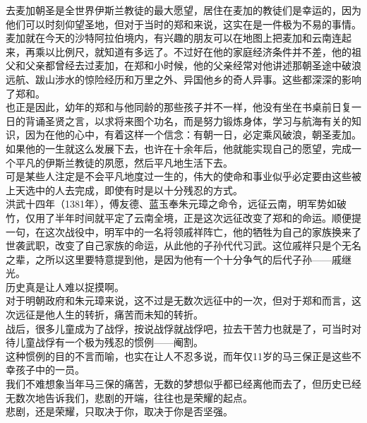 \begin{multicols}{\theparacolNo}
去麦加朝圣是全世界伊斯兰教徒的最大愿望，居住在麦加的教徒们是幸运的，因为他们可以时刻仰望圣地，但对于当时的郑和来说，这实在是一件极为不易的事情。麦加就在今天的沙特阿拉伯境内，有兴趣的朋友可以在地图上把麦加和云南连起来，再乘以比例尺，就知道有多远了。不过好在他的家庭经济条件并不差，他的祖父和父亲都曾经去过麦加，在郑和小时候，他的父亲经常对他讲述那朝圣途中破浪远航、跋山涉水的惊险经历和万里之外、异国他乡的奇人异事。这些都深深的影响了郑和。\\

也正是因此，幼年的郑和与他同龄的那些孩子并不一样，他没有坐在书桌前日复一日的背诵圣贤之言，以求将来图个功名，而是努力锻炼身体，学习与航海有关的知识，因为在他的心中，有着这样一个信念：有朝一日，必定乘风破浪，朝圣麦加。\\

如果他的一生就这么发展下去，也许在十余年后，他就能实现自己的愿望，完成一个平凡的伊斯兰教徒的夙愿，然后平凡地生活下去。\\

可是某些人注定是不会平凡地度过一生的，伟大的使命和事业似乎必定要由这些被上天选中的人去完成，即使有时是以十分残忍的方式。\\

洪武十四年（1381年），傅友德、蓝玉奉朱元璋之命令，远征云南，明军势如破竹，仅用了半年时间就平定了云南全境，正是这次远征改变了郑和的命运。顺便提一句，在这次战役中，明军中的一名将领戚祥阵亡，他的牺牲为自己的家族换来了世袭武职，改变了自己家族的命运，从此他的子孙代代习武。这位戚祥只是个无名之辈，之所以这里要特意提到他，是因为他有一个十分争气的后代子孙——戚继光。\\

历史真是让人难以捉摸啊。\\

对于明朝政府和朱元璋来说，这不过是无数次远征中的一次，但对于郑和而言，这次远征是他人生的转折，痛苦而未知的转折。\\

战后，很多儿童成为了战俘，按说战俘就战俘吧，拉去干苦力也就是了，可当时对待儿童战俘有一个极为残忍的惯例——阉割。\\

这种惯例的目的不言而喻，也实在让人不忍多说，而年仅11岁的马三保正是这些不幸孩子中的一员。\\

我们不难想象当年马三保的痛苦，无数的梦想似乎都已经离他而去了，但历史已经无数次地告诉我们，悲剧的开端，往往也是荣耀的起点。\\

悲剧，还是荣耀，只取决于你，取决于你是否坚强。\\


\end{multicols}
